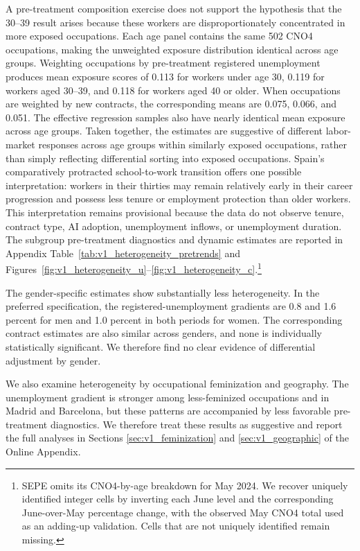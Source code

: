 \documentclass[11pt]{article}
\begin{document}
A pre-treatment composition exercise does not support the hypothesis that the 30--39 result arises because these workers are disproportionately concentrated in more exposed occupations. Each age panel contains the same 502 CNO4 occupations, making the unweighted exposure distribution identical across age groups. Weighting occupations by pre-treatment registered unemployment produces mean exposure scores of 0.113 for workers under age 30, 0.119 for workers aged 30--39, and 0.118 for workers aged 40 or older. When occupations are weighted by new contracts, the corresponding means are 0.075, 0.066, and 0.051. The effective regression samples also have nearly identical mean exposure across age groups. Taken together, the estimates are suggestive of different labor-market responses across age groups within similarly exposed occupations, rather than simply reflecting differential sorting into exposed occupations. Spain's comparatively protracted school-to-work transition offers one possible interpretation: workers in their thirties may remain relatively early in their career progression and possess less tenure or employment protection than older workers. This interpretation remains provisional because the data do not observe tenure, contract type, AI adoption, unemployment inflows, or unemployment duration. The subgroup pre-treatment diagnostics and dynamic estimates are reported in Appendix Table~\ref{tab:v1_heterogeneity_pretrends} and Figures~\ref{fig:v1_heterogeneity_u}--\ref{fig:v1_heterogeneity_c}.\footnote{SEPE omits its CNO4-by-age breakdown for May 2024. We recover uniquely identified integer cells by inverting each June level and the corresponding June-over-May percentage change, with the observed May CNO4 total used as an adding-up validation. Cells that are not uniquely identified remain missing.} 

The gender-specific estimates show substantially less heterogeneity. In the preferred specification, the registered-unemployment gradients are 0.8 and 1.6 percent for men and 1.0 percent in both periods for women. The corresponding contract estimates are also similar across genders, and none is individually statistically significant. We therefore find no clear evidence of differential adjustment by gender.

We also examine heterogeneity by occupational feminization and geography. The unemployment gradient is stronger among less-feminized occupations and in Madrid and Barcelona, but these patterns are accompanied by less favorable pre-treatment diagnostics. We therefore treat these results as suggestive and report the full analyses in Sections \ref{sec:v1_feminization} and \ref{sec:v1_geographic} of the Online Appendix.
\end{document}
